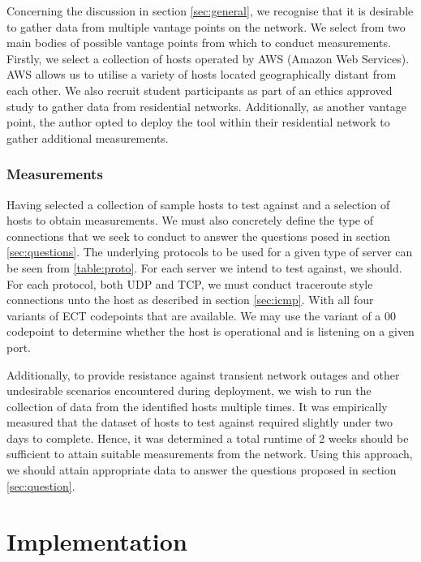 \documentclass{l4proj}
\begin{document}
Concerning the discussion in section \ref{sec:general}, we recognise that it is desirable to gather data from multiple vantage points on the network. We select from two main bodies of possible vantage points from which to conduct measurements. Firstly, we select a collection of hosts operated by AWS (Amazon Web Services). AWS allows us to utilise a variety of hosts located geographically distant from each other. We also recruit student participants as part of an ethics approved study to gather data from residential networks. Additionally, as another vantage point, the author opted to deploy the tool within their residential network to gather additional measurements.

\subsection{Measurements}

Having selected a collection of sample hosts to test against and a selection of hosts to obtain measurements. We must also concretely define the type of connections that we seek to conduct to answer the questions posed in section \ref{sec:questions}. The underlying protocols to be used for a given type of server can be seen from \ref{table:proto}. For each server we intend to test against, we should. For each protocol, both UDP and TCP, we must conduct traceroute style connections unto the host as described in section \ref{sec:icmp}. With all four variants of ECT codepoints that are available. We may use the variant of a 00 codepoint to determine whether the host is operational and is listening on a given port.

Additionally, to provide resistance against transient network outages and other undesirable scenarios encountered during deployment, we wish to run the collection of data from the identified hosts multiple times. It was empirically measured that the dataset of hosts to test against required slightly under two days to complete. Hence, it was determined a total runtime of 2 weeks should be sufficient to attain suitable measurements from the network. Using this approach, we should attain appropriate data to answer the questions proposed in section \ref{sec:question}.


\chapter{Implementation}
\end{document}
